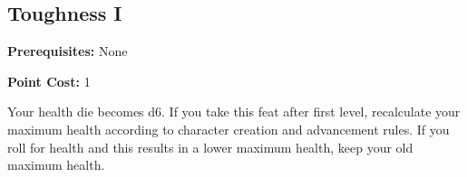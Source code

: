 \subsection{Toughness I}\label{feat:toughness1}

\noindent
\textbf{Prerequisites:} None

\noindent
\textbf{Point Cost:} 1 

Your health die becomes d6. If you take this feat after first level,
recalculate your maximum health according to character creation and advancement
rules. If you roll for health and this results in a lower maximum health, keep
your old maximum health.
